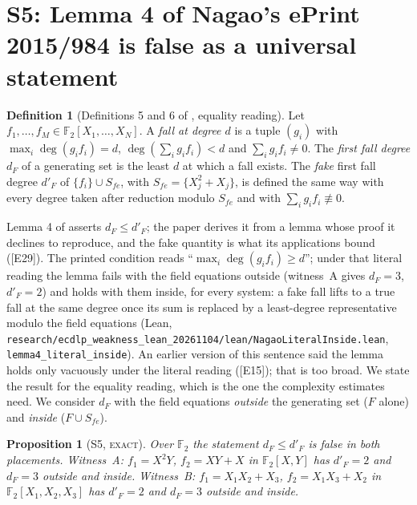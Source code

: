 \documentclass[10pt,a4paper]{article}
\newcommand{\FF}{\mathbb{F}}
\newcommand{\ev}[1]{\textup{[#1]}}
\newtheorem{proposition}[theorem]{Proposition}
\theoremstyle{definition}
\newtheorem{definition}[theorem]{Definition}
\theoremstyle{remark}
\begin{document}
\section{S5: Lemma 4 of Nagao's ePrint 2015/984 is false as a universal statement}
\label{sec:s5}

\begin{definition}[Definitions 5 and 6 of \cite{Nag15}, equality reading]
\label{def:fall}
Let $f_1,\dots,f_M\in\FF_2[X_1,\dots,X_N]$. A \emph{fall at degree $d$} is a tuple
$(g_i)$ with $\max_i\deg(g_if_i)=d$, $\deg(\sum_ig_if_i)<d$ and $\sum_ig_if_i\neq0$.
The \emph{first fall degree} $d_F$ of a generating set is the least $d$ at which a
fall exists. The \emph{fake} first fall degree $d'_F$ of $\{f_i\}\cup S_{fe}$, with
$S_{fe}=\{X_j^2+X_j\}$, is defined the same way with every degree taken after
reduction modulo $S_{fe}$ and with $\sum_ig_if_i\not\equiv0$.
\end{definition}

Lemma 4 of \cite{Nag15} asserts $d_F\le d'_F$; the paper derives it from a lemma
whose proof it declines to reproduce, and the fake quantity is what its applications
bound (\ev{E29}). The printed condition reads ``$\max_i\deg(g_if_i)\ge d$''; under
that literal reading the lemma fails with the field equations outside (witness~A
gives $d_F=3$, $d'_F=2$) and holds with them inside, for every system: a fake fall
lifts to a true fall at the same degree once its sum is replaced by a least-degree
representative modulo the field equations (Lean,
\texttt{research/ecdlp\_weakness\_lean\_20261104/lean/NagaoLiteralInside.lean},
\texttt{lemma4\_literal\_inside}). An earlier version of this sentence said the
lemma holds only vacuously under the literal reading (\ev{E15}); that is too broad.
We state the result for the equality reading, which is the one the complexity
estimates need. We
consider $d_F$ with the field equations \emph{outside} the generating set
($F$ alone) and \emph{inside} ($F\cup S_{fe}$).

\begin{proposition}[S5, \textsc{exact}]
\label{prop:lemma4}
Over $\FF_2$ the statement $d_F\le d'_F$ is false in both placements. Witness~A:
$f_1=X^2Y$, $f_2=XY+X$ in $\FF_2[X,Y]$ has $d'_F=2$ and $d_F=3$ outside and inside.
Witness~B: $f_1=X_1X_2+X_3$, $f_2=X_1X_3+X_2$ in $\FF_2[X_1,X_2,X_3]$ has $d'_F=2$ and
$d_F=3$ outside and inside.
\end{proposition}
\end{document}
